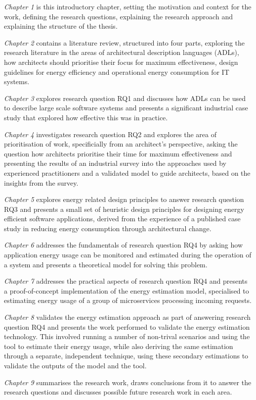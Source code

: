 \emph{Chapter 1} is this introductory chapter, setting the motivation and context for the work, defining the research questions, explaining the research approach and explaining the structure of the thesis.

\emph{Chapter 2} contains a literature review, structured into four parts, exploring the research literature in the areas of architectural description languages (ADLs), how architects should prioritise their focus for maximum effectiveness, design guidelines for energy efficiency and operational energy consumption for IT systems.

\emph{Chapter 3} explores research question RQ1 and discusses how ADLs can be used to describe large scale software systems and presents a significant industrial case study that explored how effective this was in practice.

\emph{Chapter 4} investigates research question RQ2 and explores the area of prioritisation of work, specificially from an architect's perspective, asking the question how architects prioritise their time for maximum effectiveness and presenting the results of an industrial survey into the approaches used by experienced practitioners and a validated model to guide architects, based on the insights from the survey.

\emph{Chapter 5} explores energy related design principles to answer research question RQ3 and presents a small set of heuristic design principles for designing energy efficient software applications, derived from the experience of a published case study in reducing energy consumption through architectural change.

\emph{Chapter 6} addresses the fundamentals of research question RQ4 by asking how application energy usage can be monitored and estimated during the operation of a system and presents a theoretical model for solving this problem.

\emph {Chapter 7} addresses the practical aspects of research question RQ4 and presents a proof-of-concept implementation of the energy estimation model, specialised to estimating energy usage of a group of microservices processing incoming requests.

\emph{Chapter 8} validates the energy estimation approach as part of answering research question RQ4 and presents the work performed to validate the energy estimation technology. This involved running a number of non-trival scenarios and using the tool to estimate their energy usage, while also deriving the same estimation through a separate, independent technique, using these secondary estimations to validate the outputs of the model and the tool.

\emph {Chapter 9} summarises the research work, draws conclusions from it to answer the research questions and discusses possible future research work in each area.



